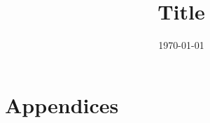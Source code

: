 \documentclass[onehalfspace]{Report}
\title{Title}				%
\date{\today}				%
\begin{document}
\begin{singlespace}


\tableofcontents
\end{singlespace}





\pagebreak



\pagebreak
\section*{Appendices}

\begin{appendices}



\end{appendices}
\end{document}
